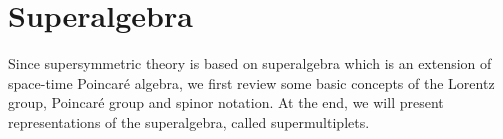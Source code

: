 \documentclass[12pt]{report}
\begin{document}













\appendix

\chapter{Superalgebra}
Since supersymmetric theory is based on superalgebra which is an extension of space-time Poincar\'{e} algebra, we first review some basic concepts of the Lorentz group, Poincar\'{e} group and spinor notation.
At the end, we will present representations of the superalgebra, called supermultiplets.%
\end{document}

